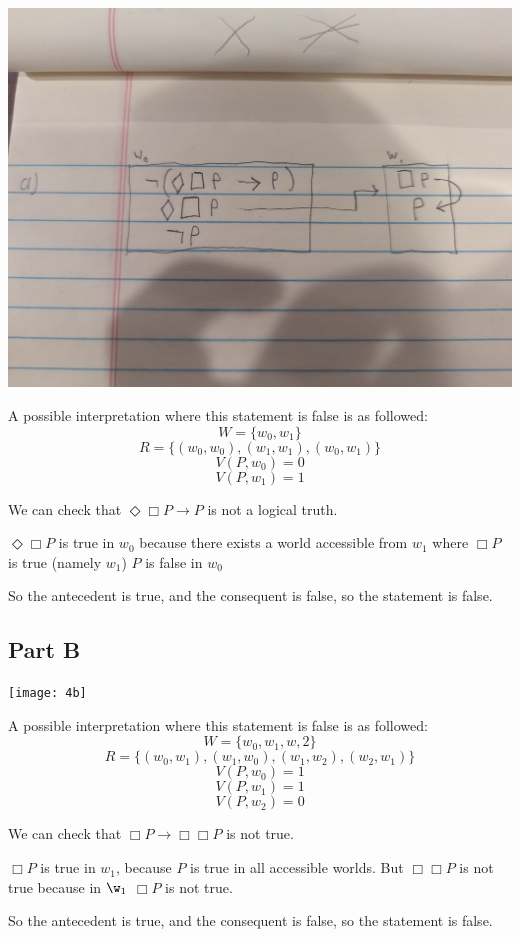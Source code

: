 \documentclass[12pt]{article}
\begin{document}
\includegraphics[width=\textwidth]{4a}

A possible interpretation where this statement is false is as followed:
\[ W = \{w_0, w_1\} \]
\[ R = \{(w_0, w_0), (w_1, w_1), (w_0, w_1)\} \]
\[ V(P, w_0) = 0 \]
\[ V(P, w_1) = 1 \]

We can check that $\Diamond \Box P \rightarrow P$ is not a logical truth. 

$\Diamond \Box P$ is true in $w_0$ because there exists a world accessible from $w_1$ where $\Box P$ is true (namely $w_1$)
$P$ is false in $w_0$

So the antecedent is true, and the consequent is false, so the statement is false.

\subsection*{Part B}

\texttt{[image: 4b]}

A possible interpretation where this statement is false is as followed:
\[ W = \{w_0, w_1, w,2\} \]
\[R = \{(w_0, w_1), (w_1, w_0),(w_1, w_2), (w_2, w_1)\} \]
\[ V(P, w_0) = 1 \]
\[ V(P, w_1) = 1 \]
\[ V(P, w_2) = 0 \]

We can check that $\Box P \rightarrow \Box \Box P$ is not true. 

$\Box P$ is true in $w_1$, because $P$ is true in all accessible worlds. 
But $\Box \Box P$ is not true because in $\w_1$ $\Box P$ is not true. 

So the antecedent is true, and the consequent is false, so the statement is false.
\end{document}
